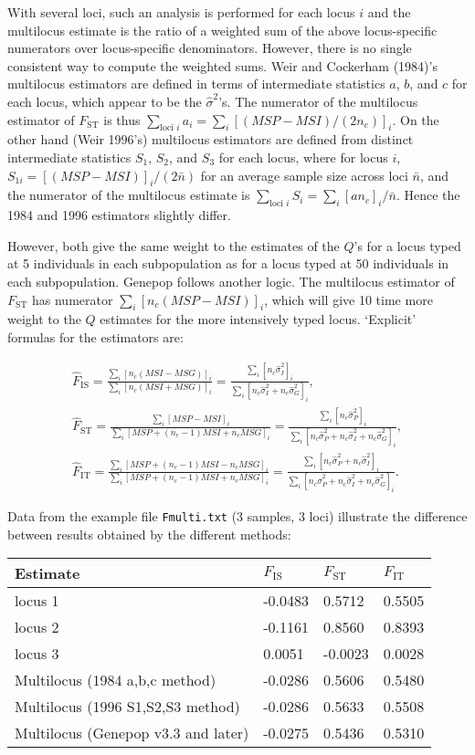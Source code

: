 \documentclass[12pt,]{book}
\begin{document}
With several loci, such an analysis is performed for each locus \(i\)
and the multilocus estimate is the ratio of a weighted sum of the above
locus-specific numerators over locus-specific denominators. However,
there is no single consistent way to compute the weighted sums. Weir and
Cockerham (1984)'s multilocus estimators are defined in terms of
intermediate statistics \(a\), \(b\), and \(c\) for each locus, which
appear to be the \(\hat{\sigma}^2\)'s. The numerator of the multilocus
estimator of \(F_\mathrm{ST}\) is thus
\(\sum_{\textrm{loci }i}a_i=\sum_{i}[(MSP-MSI)/(2n_c)]_i\). On the other
hand (Weir 1996's) multilocus estimators are defined from distinct
intermediate statistics \(S_1\), \(S_2\), and \(S_3\) for each locus,
where for locus \(i\), \(S_{1i}=[(MSP-MSI)]_i/(2\bar{n})\) for an
average sample size across loci \(\bar{n}\), and the numerator of the
multilocus estimate is
\(\sum_{\textrm{loci }i}S_i=\sum_{i}[a n_c]_i/\bar{n}\). Hence the 1984
and 1996 estimators slightly differ.

However, both give the same weight to the estimates of the \(Q\)'s for a
locus typed at 5 individuals in each subpopulation as for a locus typed
at 50 individuals in each subpopulation. Genepop follows another logic.
The multilocus estimator of \(F_\mathrm{ST}\) has numerator
\(\sum_i [n_c(MSP-MSI)]_i\), which will give 10 time more weight to the
\(Q\) estimates for the more intensively typed locus. `Explicit'
formulas for the estimators are:

\[\begin{gathered}
    \hat{F}_{\mathrm{IS}}=    \frac{\sum_i [n_c(MSI-MSG)]_i}{\sum_i [n_c(MSI+MSG)]_i}=
    \frac{\sum_i [n_c\hat{\sigma}^2_I]_i}{\sum_i [n_c\hat{\sigma}^2_I+n_c\hat{\sigma}^2_G]_i}, \\
        \hat{F}_{\mathrm{ST}}=    \frac{\sum_i [MSP-MSI]_i}{\sum_i [MSP+(n_c-1)MSI+n_cMSG]_i}=
    \frac{\sum_i [n_c\hat{\sigma}^2_P]_i}{\sum_i [n_c\hat{\sigma}^2_P+n_c\hat{\sigma}^2_I+n_c\hat{\sigma}^2_G]_i}, \\
        \hat{F}_{\mathrm{IT}}=    \frac{\sum_i [MSP+(n_c-1)MSI-n_cMSG]_i}{\sum_i [MSP+(n_c-1)MSI+n_cMSG]_i}=
    \frac{\sum_i [n_c\hat{\sigma}^2_P+n_c\hat{\sigma}^2_I]_i}{\sum_i [n_c\hat{\sigma}^2_P+n_c\hat{\sigma}^2_I+n_c\hat{\sigma}^2_G]_i}.\end{gathered}\]

Data from the example file \texttt{Fmulti.txt} (3 samples, 3 loci)
illustrate the difference between results obtained by the different
methods:

\begin{longtable}[]{@{}llll@{}}
\toprule
Estimate & \(F_\mathrm{IS}\) & \(F_\mathrm{ST}\) &
\(F_\mathrm{IT}\)\tabularnewline
\midrule
\endhead
locus 1 & -0.0483 & 0.5712 & 0.5505\tabularnewline
locus 2 & -0.1161 & 0.8560 & 0.8393\tabularnewline
locus 3 & 0.0051 & -0.0023 & 0.0028\tabularnewline
Multilocus (1984 a,b,c method) & -0.0286 & 0.5606 &
0.5480\tabularnewline
Multilocus (1996 S1,S2,S3 method) & -0.0286 & 0.5633 &
0.5508\tabularnewline
Multilocus (Genepop v3.3 and later) & -0.0275 & 0.5436 &
0.5310\tabularnewline
\bottomrule
\end{longtable}
\end{document}
